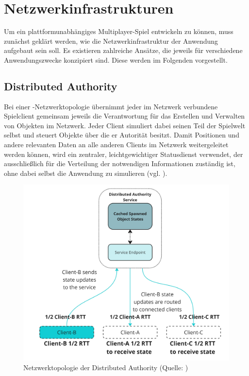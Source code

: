 \section{Netzwerkinfrastrukturen}\label{sec:basics-network-structures}
Um ein plattformunabhängiges Multiplayer-Spiel entwickeln zu können, muss zunächst geklärt werden, wie die Netzwerkinfrastruktur der Anwendung aufgebaut sein soll. Es existieren zahlreiche Ansätze, die jeweils für verschiedene Anwendungszwecke konzipiert sind. Diese werden im Folgenden vorgestellt.

\subsection{Distributed Authority}
Bei einer -Netzwerktopologie übernimmt jeder im Netzwerk verbundene Spielclient gemeinsam jeweils die Verantwortung für das Erstellen und Verwalten von Objekten im Netzwerk. Jeder Client simuliert dabei seinen Teil der Spielwelt selbst und steuert Objekte über die er Autorität besitzt.
Damit Positionen und andere relevanten Daten an alle anderen Clients im Netzwerk weitergeleitet werden können, wird ein zentraler, leichtgewichtiger Statusdienst verwendet, der ausschließlich für die Verteilung der notwendigen Informationen zuständig ist, ohne dabei selbst die Anwendung zu simulieren (vgl. \citealp{noauthor_distributed_2025}).

\begin{figure}[ht]
\centering
\includegraphics[width=1\linewidth]{content/pictures/distributed-authority-service.jpg}
\caption{Netzwerktopologie der Distributed Authority (Quelle: \citealp{noauthor_distributed_2025})}
\label{fig:distributed_authority_topology}
\end{figure}

